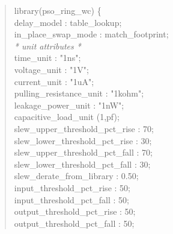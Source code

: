 \documentclass[a4paper]{article}
\begin{document}
\begin{verse}
\vspace*{1em}
library(pso\_ring\_wc) \{\\
\vspace*{1em}
\hspace*{2em}delay\_model : table\_lookup;\\
\hspace*{2em}in\_place\_swap\_mode : match\_footprint;\\
\vspace*{1em}
\hspace*{2em}\emph{* unit attributes *}\\
\hspace*{2em}time\_unit : "1ns";\\
\hspace*{2em}voltage\_unit : "1V";\\
\hspace*{2em}current\_unit : "1uA";\\
\hspace*{2em}pulling\_resistance\_unit : "1kohm";\\
\hspace*{2em}leakage\_power\_unit : "1nW";\\
\hspace*{2em}capacitive\_load\_unit (1,pf);\\
\vspace*{1em}
\hspace*{2em}slew\_upper\_threshold\_pct\_rise : 70;\\
\hspace*{2em}slew\_lower\_threshold\_pct\_rise : 30;\\
\hspace*{2em}slew\_upper\_threshold\_pct\_fall : 70;\\
\hspace*{2em}slew\_lower\_threshold\_pct\_fall : 30;\\
\hspace*{2em}slew\_derate\_from\_library :  0.50;\\
\hspace*{2em}input\_threshold\_pct\_rise : 50;\\
\hspace*{2em}input\_threshold\_pct\_fall : 50;\\
\hspace*{2em}output\_threshold\_pct\_rise : 50;\\
\hspace*{2em}output\_threshold\_pct\_fall : 50;\\

\end{verse}
\end{document}
